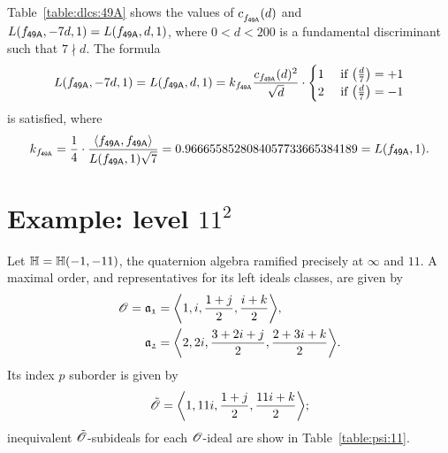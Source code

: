 Table~\ref{table:dlcs:49A} shows
the values of $c^{}_{f_\mathsf{{49A}}}(d)$
and $L(f_\mathsf{{49A}},-7d,1) = L(f_\mathsf{{49A}},d,1)$,
where $0<d<200$ is a fundamental discriminant
such that
$7\nmid d$.
The formula
\[
  L(\mf{49A},-7d,1) = L(\mf{49A},d,1)
  = k_{\mf{49A}} \frac{c_{\mf{49A}}(d)^2}{\sqrt{d}}
\cdot\begin{cases}
      1 & \text{ if $\kro{d}{7} = +1$} \\
      2 & \text{ if $\kro{d}{7} = -1$} \\
    \end{cases}
\]
is satisfied, where 
\[
  k_{\mf{49A}} = \frac{1}{4}\cdot
  \frac{\<\mf{49A},\mf{49A}>}
        {L(\mf{49A},1)\sqrt{7}}
  = 0.9666558528084057733665384189  = L(\mf{49A},1).
\]
\section{Example: level $11^2$}
Let ${\mathbb{H}}={\mathbb{H}}(-1,-11)$,
the quaternion algebra ramified precisely at $\infty$ and $11$.
A maximal order,
and representatives for its left ideals classes, are given by
\begin{align*}
   \O=\id{a_{1}}&=\<1,i,\frac{1+j}{2},\frac{i+k}{2}>, \\
     \id{a_{2}}&=\<2,2i,\frac{3+2i+j}{2},\frac{2+3i+k}{2}>. \\
\end{align*}
Its index $p$ suborder is given by
\[
  \Ot = \<1,11i,\frac{1+j}{2},\frac{11i+k}{2}>;
\]
inequivalent ${\tilde{{\mathscr{O}}}}$-subideals for each ${\mathscr{O}}$-ideal are show in
Table~\ref{table:psi:11}.

